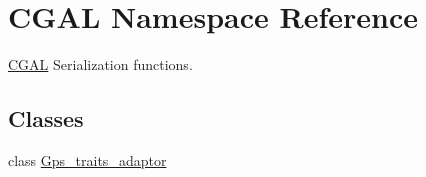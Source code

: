 \hypertarget{namespace_c_g_a_l}{}\section{C\+G\+AL Namespace Reference}
\label{namespace_c_g_a_l}


\mbox{\hyperlink{namespace_c_g_a_l}{C\+G\+AL}} Serialization functions.  


\subsection*{Classes}
\begin{DoxyCompactItemize}
\item 
class \mbox{\hyperlink{class_c_g_a_l_1_1_gps__traits__adaptor}{Gps\+\_\+traits\+\_\+adaptor}}
\end{DoxyCompactItemize}
